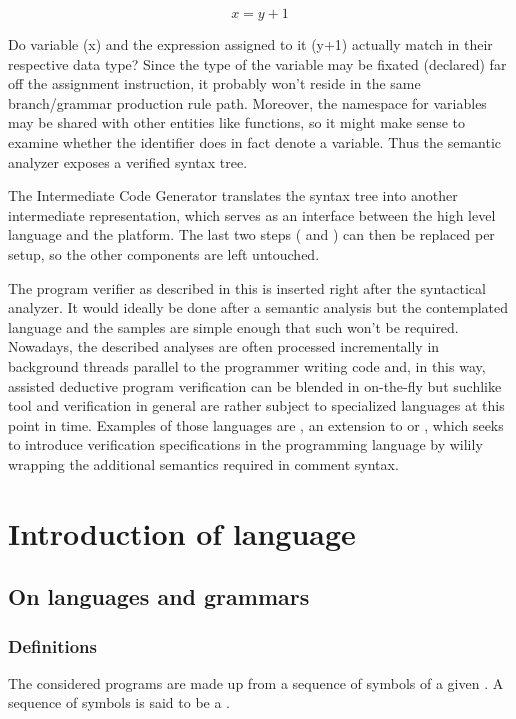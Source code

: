 \begin{equation}
	x=y+1
\end{equation}

Do variable (x) and the expression assigned to it (y+1) actually match in their respective data type? Since the type of the variable may be fixated (declared) far off the assignment instruction, it probably won't reside in the same branch/grammar production rule path. Moreover, the namespace for variables may be shared with other entities like functions, so it might make sense to examine whether the identifier does in fact denote a variable. Thus the semantic analyzer exposes a verified syntax tree.

The Intermediate Code Generator translates the syntax tree into another intermediate representation, which serves as an interface between the high level language and the platform. The last two steps ( and ) can then be replaced per setup, so the other components are left untouched.

The program verifier as described in this \paper{} is inserted right after the syntactical analyzer. It would ideally be done after a semantic analysis but the contemplated language and the samples are simple enough that such won't be required. Nowadays, the described analyses are often processed incrementally in background threads parallel to the programmer writing code and, in this way, assisted deductive program verification can be blended in on-the-fly but suchlike tool and verification in general are rather subject to specialized languages at this point in time. Examples of those languages are , an extension to  or , which seeks to introduce verification specifications in the  programming language by wilily wrapping the additional semantics required in comment syntax.

\chapter{Introduction of language}
\label{Introduction of language}

\section{On languages and grammars}\label{sec:lang_grammars}

\subsection{Definitions}
The considered programs are made up from a sequence of symbols of a given . A sequence of symbols is said to be a .

